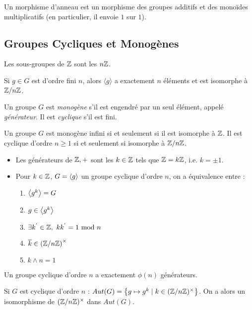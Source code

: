 \documentclass{cours}
\begin{document}
\begin{definition}
    Un morphisme d'anneau est un morphisme des groupes additifs et des monoïdes multiplicatifs (en particulier, il envoie $1$ sur $1$).
\end{definition}

\subsection{Groupes Cycliques et Monogènes}
\begin{proposition}
    Les sous-groupes de $\mathbb{Z}$ sont les $n\mathbb{Z}$.
\end{proposition}

\begin{proposition}
    Si $g \in G$ est d'ordre fini $n$, alors $\langle g \rangle$ a exactement $n$ éléments et est isomorphe à $\mathbb{Z}/n\mathbb{Z}$. 
\end{proposition}

\begin{definition}
    Un groupe $G$ est \emph{monogène} s'il est engendré par un seul élément, appelé \emph{générateur}. Il est \emph{cyclique} s'il est fini. 
\end{definition}

\begin{corollary}
    Un groupe $G$ est monogène infini si et seulement si il est isomorphe à $\mathbb{Z}$. Il est cyclique d'ordre $n \geq 1$ si et seulement si isomorphe à $\mathbb{Z}/n\mathbb{Z}$.
\end{corollary}

\begin{proposition}
    \begin{itemize}
        \item Les générateurs de $\mathbb{Z}, +$ sont les $k \in \mathbb{Z}$ tels que $\mathbb{Z} = k\mathbb{Z}$, i.e. $k = \pm 1$.
        \item Pour $k \in \mathbb{Z}$, $G = \left\langle g \right\rangle$ un groupe cyclique d'ordre $n$, on a équivalence entre :
        \begin{enumerate}
            \item $\left\langle g^{k} \right\rangle = G$
            \item $g \in \left\langle g^{k} \right\rangle$
            \item $\exists k^{'} \in \mathbb{Z},\ kk^{'} = 1 \text{ mod } n$
            \item $\overline{k} \in \left(\mathbb{Z}/n\mathbb{Z}\right)^{\times}$
            \item $k \wedge n = 1$
        \end{enumerate}
    \end{itemize}
\end{proposition}
\begin{corollary}
    Un groupe cyclique d'ordre $n$ a exactement $\phi(n)$ générateurs.
\end{corollary}
\begin{corollary}
    Si $G$ est cyclique d'ordre $n$ : $Aut(G) = \left\{g \mapsto g^{k} \mid k \in (\mathbb{Z}/n\mathbb{Z})^{\times}\right\}$. On a alors un isomorphisme de $(\mathbb{Z}/n\mathbb{Z})^{\times}$ dans $Aut(G)$.
\end{corollary}
\end{document}
